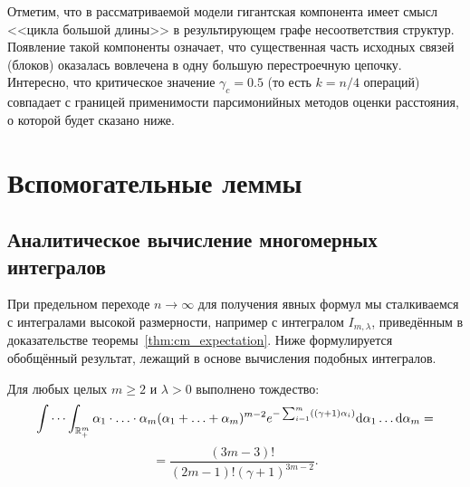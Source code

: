 Отметим, что в рассматриваемой модели гигантская компонента имеет смысл <<цикла большой длины>> в результирующем графе несоответствия структур. Появление такой компоненты означает, что существенная часть исходных связей (блоков) оказалась вовлечена в одну большую перестроечную цепочку. Интересно, что критическое значение $\gamma_c = 0.5$ (то есть $k = n/4$ операций) совпадает с границей применимости парсимонийных методов оценки расстояния, о которой будет сказано ниже.

\section{Вспомогательные леммы}

\subsection{Аналитическое вычисление многомерных интегралов}

При предельном переходе $n \to \infty$ для получения явных формул мы сталкиваемся с интегралами высокой размерности, например с интегралом $I_{m,\lambda}$, приведённым в доказательстве теоремы~\ref{thm:cm_expectation}. Ниже формулируется обобщённый результат, лежащий в основе вычисления подобных интегралов.

\begin{lemma}\label{lem:integral}
Для любых целых $m \ge 2$ и $\lambda > 0$ выполнено тождество:
$$
    \idotsint_{ \mathbb{R}^m_+} {
        \alpha_1 \cdot \ldots \cdot \alpha_m
        (\alpha_1 + \ldots + \alpha_m) ^ {m - 2}
        e ^ { -\sum_{i=1}^{m} ((\gamma + 1) \alpha_i)}
        \mathrm{d} \alpha_1 \ldots \mathrm{d} \alpha_m
    } = $$ $$ =  \frac
    {(3 m - 3)!}
    {(2 m - 1)! (\gamma + 1) ^ {3 m - 2}}
    \label{l-int}.
$$
\end{lemma}

